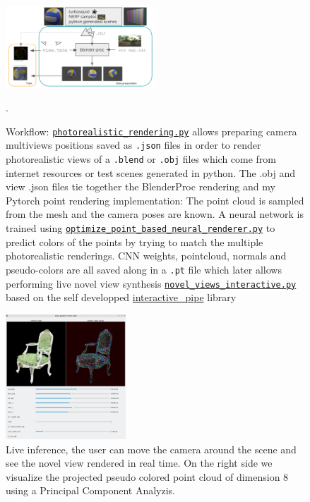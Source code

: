 \begin{figure}[htpb]
    \centering
    \includegraphics[width=0.5\textwidth]{figures/data_prep_and_training.png}
    \caption{Workflow: \href{https://github.com/balthazarneveu/per-pixel-point-rendering/blob/main/studies/photorealistic\_rendering.py}{\texttt{photorealistic\_rendering.py}} allows preparing camera multiviews positions saved as \texttt{.json} files in order to render photorealistic views of a \texttt{.blend} or  \texttt{.obj} files which come from internet resources or test scenes generated in python.
    The .obj and view .json files tie together the BlenderProc rendering and my Pytorch point rendering implementation: The point cloud is sampled from the mesh and the camera poses are known. A neural network is trained using \href{https://github.com/balthazarneveu/per-pixel-point-rendering/blob/main/scripts/optimize\_point\_based\_neural\_renderer.py}{\texttt{optimize\_point\_based\_neural\_renderer.py}} to predict colors of the points by trying to match the multiple photorealistic renderings. CNN weights, pointcloud, normals and pseudo-colors are all saved along in a \texttt{.pt} file which later allows performing live novel view synthesis \href{https://github.com/balthazarneveu/per-pixel-point-rendering/blob/main/scripts/novel\_views\_interactive.py}{\texttt{novel\_views\_interactive.py}} based on the self developped \href{https://github.com/balthazarneveu/interactive\_pipe}{interactive\_pipe} library}.
    \label{fig:data_and_train}
\end{figure}

\begin{figure}[htpb]
    \centering
    \includegraphics[width=0.4\textwidth]{figures/inference_live.png}
    \caption{Live inference, the user can move the camera around the scene and see the novel view rendered in real time. On the right side we visualize the projected pseudo colored point cloud of dimension 8 using a Principal Component Analyzis.}
    \label{fig:live_inference}
\end{figure}


